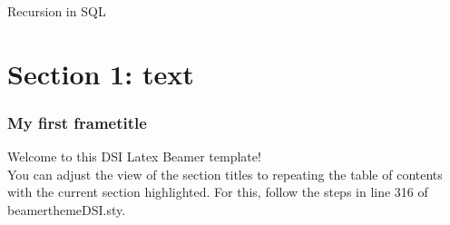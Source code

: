 \documentclass[aspectratio=169,10pt]{beamer}
\newcommand{\motivationtitlefont}{\large\bfseries}
\newcommand{\motivationbodyfont}{\small}
\newcommand{\motivationpadding}{10pt}
\newcommand{\motivationgap}{8pt}
\newcommand{\motivationtextgap}{4pt}
\newcommand{\motivationcard}[3]{%
  \par\noindent
  \begin{tikzpicture}
    \node[fill=#3,draw=UHblack!9,rounded corners=4pt,
      text width=\dimexpr\linewidth-0.8cm-1pt\relax,
      inner xsep=0.4cm,inner ysep=\motivationpadding,outer sep=0pt,
      align=left,font=\motivationbodyfont] (card) {%
      {\color{UHblack}\motivationtitlefont #1\par}
      \vspace{\motivationtextgap}
      {\color{UHblack!75}#2\par}%
    };
    \draw[UHred,line width=2pt,line cap=round]
      ([xshift=1pt,yshift=-8pt]card.north west) --
      ([xshift=1pt,yshift=8pt]card.south west);
  \end{tikzpicture}%
  \par\addvspace{\motivationgap}
}
\begin{document}
\begin{frame}{Recursion in SQL}
\end{frame}

\section{Section 1: text}
\begin{frame}
\frametitle{My first frametitle}
Welcome to this DSI Latex Beamer template!
\vspace{2cm}
\\You can adjust the view of the section titles to repeating the table of contents with the current section highlighted. For this, follow the steps in line 316 of beamerthemeDSI.sty.
\end{frame}
\end{document}
